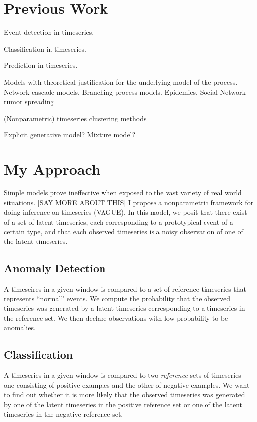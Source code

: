 \section{Previous Work}

Event detection in timeseries.

Classification in timeseries.

Prediction in timeseries.

Models with theoretical justification for the underlying model of the process. Network cascade models. Branching process models.
Epidemics, Social Network rumor spreading

(Nonparametric) timeseries clustering methods

Explicit generative model? Mixture model?

\section{My Approach}
Simple models prove ineffective when exposed to the vast variety of real world situations. [SAY MORE ABOUT THIS] I propose a nonparametric framework for doing inference on timeseries (VAGUE). In this model, we posit that there exist of a set of latent timeseries, each corresponding to a prototypical event of a certain type, and that each observed timeseries is a noisy observation of one of the latent timeseries.

\subsection{Anomaly Detection}
A timeseires in a given window is compared to a set of reference timeseries that represents ``normal'' events. We compute the probability that the observed timeseries was generated by a latent timeseries corresponding to a timeseries in the reference set. We then declare observations with low probability to be anomalies.

\subsection{Classification}
A timeseries in a given window is compared to two {\em reference} sets of timeseries --- one consisting of positive examples and the other of negative examples. We want to find out whether it is more likely that the observed timeseries was generated by one of the latent timeseries in the positive reference set or one of the latent timeseries in the negative reference set.

